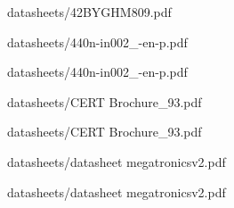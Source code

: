 

            {datasheets/42BYGHM809.pdf}


            {datasheets/440n-in002_-en-p.pdf}


            {datasheets/440n-in002_-en-p.pdf}


            {datasheets/CERT Brochure_93.pdf}


            {datasheets/CERT Brochure_93.pdf}


            {datasheets/datasheet megatronicsv2.pdf}


            {datasheets/datasheet megatronicsv2.pdf}

